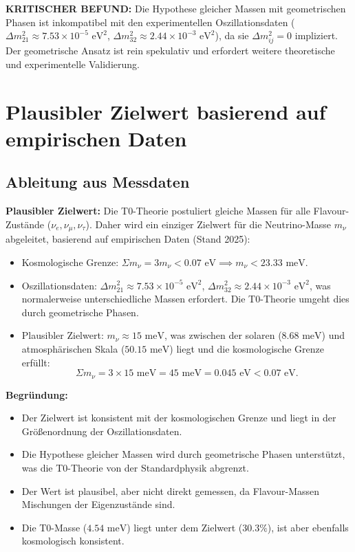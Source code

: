 	\begin{warning}
		\textbf{KRITISCHER BEFUND:} Die Hypothese gleicher Massen mit geometrischen Phasen ist inkompatibel mit den experimentellen Oszillationsdaten (\(\Delta m^2_{21} \approx 7.53 \times 10^{-5} \text{ eV}^2\), \(\Delta m^2_{32} \approx 2.44 \times 10^{-3} \text{ eV}^2\)), da sie \(\Delta m^2_{ij} = 0\) impliziert. Der geometrische Ansatz ist rein spekulativ und erfordert weitere theoretische und experimentelle Validierung.
	\end{warning}
	
	\section{Plausibler Zielwert basierend auf empirischen Daten}
	
	\subsection{Ableitung aus Messdaten}
	
	\begin{experimental}
		\textbf{Plausibler Zielwert:}
		Die T0-Theorie postuliert gleiche Massen für alle Flavour-Zustände (\(\nu_e, \nu_\mu, \nu_\tau\)). Daher wird ein einziger Zielwert für die Neutrino-Masse \(m_\nu\) abgeleitet, basierend auf empirischen Daten (Stand 2025):
		\begin{itemize}
			\item Kosmologische Grenze: \(\Sigma m_\nu = 3 m_\nu < 0.07 \text{ eV} \implies m_\nu < 23.33 \text{ meV}\).
			\item Oszillationsdaten: \(\Delta m^2_{21} \approx 7.53 \times 10^{-5} \text{ eV}^2\), \(\Delta m^2_{32} \approx 2.44 \times 10^{-3} \text{ eV}^2\), was normalerweise unterschiedliche Massen erfordert. Die T0-Theorie umgeht dies durch geometrische Phasen.
			\item Plausibler Zielwert: \(m_\nu \approx 15 \text{ meV}\), was zwischen der solaren (\(8.68 \text{ meV}\)) und atmosphärischen Skala (\(50.15 \text{ meV}\)) liegt und die kosmologische Grenze erfüllt:
			\[
			\Sigma m_\nu = 3 \times 15 \text{ meV} = 45 \text{ meV} = 0.045 \text{ eV} < 0.07 \text{ eV}.
			\]
		\end{itemize}
		
		\textbf{Begründung:}
		\begin{itemize}
			\item Der Zielwert ist konsistent mit der kosmologischen Grenze und liegt in der Größenordnung der Oszillationsdaten.
			\item Die Hypothese gleicher Massen wird durch geometrische Phasen unterstützt, was die T0-Theorie von der Standardphysik abgrenzt.
			\item Der Wert ist plausibel, aber nicht direkt gemessen, da Flavour-Massen Mischungen der Eigenzustände sind.
			\item Die T0-Masse (\(4.54 \text{ meV}\)) liegt unter dem Zielwert (\(30.3\%\)), ist aber ebenfalls kosmologisch konsistent.
		\end{itemize}
	\end{experimental}
	

